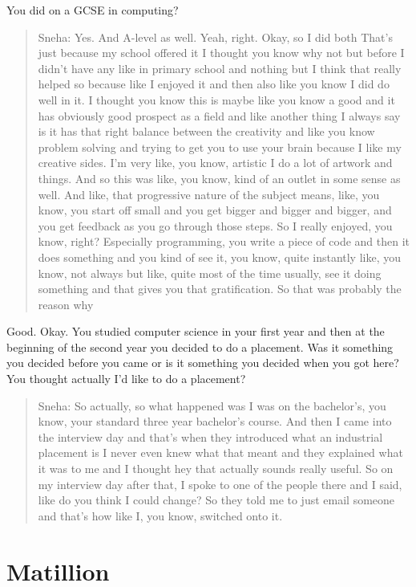 \documentclass[
]{book}
\begin{document}
You did on a GCSE in computing?

\begin{quote}
Sneha: Yes. And A-level as well. Yeah, right. Okay, so I did both That's just because my school offered it I thought you know why not but before I didn't have any like in primary school and nothing but I think that really helped so because like I enjoyed it and then also like you know I did do well in it. I thought you know this is maybe like you know a good and it has obviously good prospect as a field and like another thing I always say is it has that right balance between the creativity and like you know problem solving and trying to get you to use your brain because I like my creative sides. I'm very like, you know, artistic I do a lot of artwork and things. And so this was like, you know, kind of an outlet in some sense as well. And like, that progressive nature of the subject means, like, you know, you start off small and you get bigger and bigger and bigger, and you get feedback as you go through those steps. So I really enjoyed, you know, right? Especially programming, you write a piece of code and then it does something and you kind of see it, you know, quite instantly like, you know, not always but like, quite most of the time usually, see it doing something and that gives you that gratification. So that was probably the reason why
\end{quote}

Good. Okay. You studied computer science in your first year and then at the beginning of the second year you decided to do a placement. Was it something you decided before you came or is it something you decided when you got here? You thought actually I'd like to do a placement?

\begin{quote}
Sneha: So actually, so what happened was I was on the bachelor's, you know, your standard three year bachelor's course. And then I came into the interview day and that's when they introduced what an industrial placement is I never even knew what that meant and they explained what it was to me and I thought hey that actually sounds really useful. So on my interview day after that, I spoke to one of the people there and I said, like do you think I could change? So they told me to just email someone and that's how like I, you know, switched onto it.
\end{quote}

\hypertarget{matillion}{%
\section{Matillion}\label{matillion}}
\end{document}
